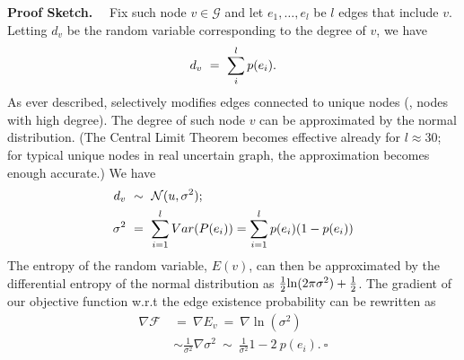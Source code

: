 \textbf{Proof Sketch.}~~
Fix such node $v \in \mathcal{G}$ and let $e_{1},\ldots, e_{l}$ be $l$ edges that include $v$. 
Letting $d_{v}$ be the random variable corresponding to the degree of $v$, 
we have 
\vspace{-7pt}
\begin{equation*}
  d_{v} ~=~ \sum_{i}^{l} p(e_{i}). 
  \vspace{-5pt}
\end{equation*}
As ever described, {\methodName} selectively modifies edges connected to unique nodes ({\ie}, nodes with high degree).
The degree of such node $v$ can be approximated by the normal distribution. (The Central Limit Theorem becomes effective already for $l\approx 30$; for typical unique nodes in real uncertain graph, the approximation becomes enough accurate.) We have
\vspace{-5pt}
\begin{align*}
   d_{v}~&\sim~\mathcal{N}(u, \sigma^2); \\
   \sigma^{2}~&=~\sum_{i=1}^{l} Var(P(e_{i}))=\sum_{i=1}^{l} p(e_{i}) (1-p(e_{i}))
   \vspace{-15pt}
\end{align*}
The entropy of the random variable, $E(v)$, can then be approximated by the differential entropy of the normal distribution as ${{1}\over{2}}{\ln (2\pi\sigma^2)}+ {{1}\over{2}}$. 
The gradient of our objective function w.r.t the edge existence probability can be rewritten as
\begin{align*} 
  \nabla \mathcal{F}~&=~\nabla E_{v}~=~\nabla \ln(\sigma^2) \\
                    ~&\sim \frac{1}{\sigma^2} \nabla \sigma^{2}~\sim~\frac{1}{\sigma^2} 1-2~p(e_{i}).~\square
\end{align*}








